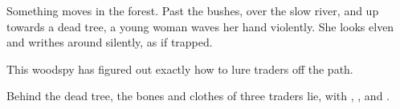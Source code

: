 \begin{boxtext}
  Something moves in the forest.
  Past the bushes, over the slow river, and up towards a dead tree, a young woman waves her hand violently.
  She looks elven and writhes around silently, as if trapped.
\end{boxtext}

\woodspy

This \gls{woodspy} has figured out exactly how to lure traders off the path.

Behind the dead tree, the bones and clothes of three traders lie, with \lootBig, \lootJewellery, and \lootJewellery.
